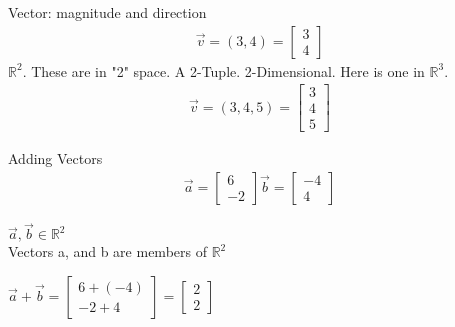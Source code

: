 \documentclass{article}
\begin{document}
	Vector: magnitude and direction
	\begin{align*}
			\vec{v} = (3, 4) = \begin{bmatrix} 3\\ 4 \end{bmatrix}
	\end{align*}
	$\mathbb{R}^2$. These are in "2" space. A 2-Tuple. 2-Dimensional.
	Here is one in $\mathbb{R}^3$.
	\begin{align*}
			\vec{v} = (3, 4, 5) = \begin{bmatrix} 3\\ 4 \\5\end{bmatrix}
	\end{align*}

	Adding Vectors
	\begin{align*}
		\vec{a} = \begin{bmatrix} 6 \\ -2\end{bmatrix}
		\vec{b} = \begin{bmatrix} -4 \\ 4\end{bmatrix}
	\end{align*}

	$\vec{a}, \vec{b} \in \mathbb{R}^2$ \\
	Vectors a, and b are members of $\mathbb{R}^2$

	$\vec{a} + \vec{b} = 
		\begin{bmatrix} 6 + (-4) \\ -2 + 4\end{bmatrix} = 
		\begin{bmatrix} 2 \\ 2 \end{bmatrix}$
	
\end{document}
